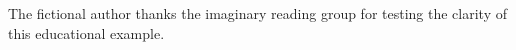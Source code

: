 The fictional author thanks the imaginary reading group for testing the clarity of this educational example.
